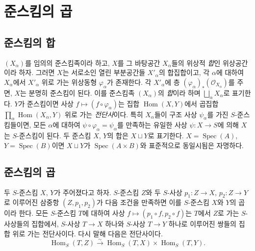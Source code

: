 \section{준스킴의 곱}
\label{section:I.3-ko}

\subsection{준스킴의 합}
\label{subsection:I.3.1-ko}

\label{I.3.1.1-ko}
$(X_\alpha)$를 임의의 준스킴족이라 하고, $X$를 그 바탕공간
$X_\alpha$들의 위상적 \emph{합}인 위상공간이라 하자. 그러면 $X$는
서로소인 열린 부분공간들 $X'_\alpha$의 합집합이고, 각 $\alpha$에
대하여 $X_\alpha$에서 $X'_\alpha$ 위로 가는 위상동형
$\varphi_\alpha$가 존재한다. 각 $X'_\alpha$에 층
$(\varphi_\alpha)_*(\mathscr{O}_{X_\alpha})$를 주면, $X$는 분명히
준스킴이 된다. 이를 준스킴족 $(X_\alpha)$의 \emph{합}이라 하며
$\bigsqcup_\alpha X_\alpha$로 표기한다. $Y$가 준스킴이면 사상
$f\mapsto(f\circ\varphi_\alpha)$는 집합 $\operatorname{Hom}(X,Y)$에서
곱집합 $\prod_\alpha\operatorname{Hom}(X_\alpha,Y)$ 위로 가는
\emph{전단사}이다. 특히 $X_\alpha$들이 구조 사상
$\psi_\alpha$를 가진 $S$-준스킴들이면, 모든 $\alpha$에 대하여
$\psi\circ\varphi_\alpha=\psi_\alpha$를 만족하는 유일한 사상
$\psi:X\to S$에 의해 $X$는 $S$-준스킴이 된다. 두 준스킴 $X$, $Y$의
합은 $X\sqcup Y$로 표기한다. $X=\operatorname{Spec}(A)$,
$Y=\operatorname{Spec}(B)$이면 $X\sqcup Y$가
$\operatorname{Spec}(A\times B)$와 표준적으로 동일시됨은 자명하다.

\subsection{준스킴의 곱}
\label{subsection:I.3.2-ko}

\begin{definition}[3.2.1]
\label{I.3.2.1-ko}
두 $S$-준스킴 $X$, $Y$가 주어졌다고 하자. $S$-준스킴 $Z$와 두
$S$-사상 $p_1:Z\to X$, $p_2:Z\to Y$로 이루어진 삼중항
$(Z,p_1,p_2)$가 다음 조건을 만족하면 이를 $S$-준스킴 $X$와 $Y$의
곱이라 한다. 모든 $S$-준스킴 $T$에 대하여 사상
$f\mapsto(p_1\circ f,p_2\circ f)$는 $T$에서 $Z$로 가는 $S$-사상들의
집합에서, $S$-사상 $T\to X$ 하나와 $S$-사상 $T\to Y$ 하나로
이루어진 쌍들의 집합 위로 가는 전단사이다. 다시 말해 다음은
전단사이다.
\[
  \operatorname{Hom}_S(T,Z)\xrightarrow{\sim}
  \operatorname{Hom}_S(T,X)\times\operatorname{Hom}_S(T,Y).
\]
\end{definition}

